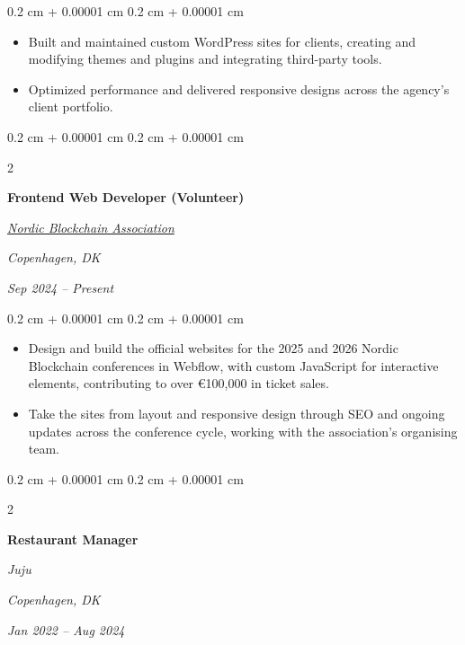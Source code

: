 \documentclass[10pt, letterpaper]{article}
\newenvironment{highlights}{
    \begin{itemize}[
        topsep=0.10 cm,
        parsep=0.10 cm,
        partopsep=0pt,
        itemsep=0pt,
        leftmargin=0.4 cm + 10pt
    ]
}{
    \end{itemize}
} %
\newenvironment{onecolentry}{
    \begin{adjustwidth}{
        0.2 cm + 0.00001 cm
    }{
        0.2 cm + 0.00001 cm
    }
}{
    \end{adjustwidth}
} %
\newenvironment{twocolentry}[2][]{
    \onecolentry
    \def\secondColumn{#2}
    \setcolumnwidth{\fill, 4.5 cm}
    \begin{paracol}{2}
}{
    \switchcolumn \raggedleft \secondColumn
    \end{paracol}
    \endonecolentry
} %
\let\hrefWithoutArrow\href
\renewcommand{\href}[2]{\hrefWithoutArrow{#1}{\ifthenelse{\equal{#2}{}}{ }{#2 }\raisebox{.15ex}{\footnotesize \faExternalLink*}}}
\begin{document}
        \vspace{0.10 cm}

        \begin{onecolentry}
            \begin{highlights}
                \item Built and maintained custom WordPress sites for clients, creating and modifying themes and plugins and integrating third-party tools.
                \item Optimized performance and delivered responsive designs across the agency's client portfolio.
            \end{highlights}
        \end{onecolentry}

        \vspace{0.30 cm}

        \begin{twocolentry}{
            \textit{Copenhagen, DK}

            \textit{Sep 2024 – Present}}
            \textbf{Frontend Web Developer (Volunteer)}

            \hrefWithoutArrow{https://www.nordicblockchain.com/} {\color{black} \hspace*{0.13cm}\textit{Nordic Blockchain Association}}
        \end{twocolentry}

        \vspace{0.10 cm}

        \begin{onecolentry}
            \begin{highlights}
                \item Design and build the official websites for the 2025 and 2026 Nordic Blockchain conferences in Webflow, with custom JavaScript for interactive elements, contributing to over €100,000 in ticket sales.
                \item Take the sites from layout and responsive design through SEO and ongoing updates across the conference cycle, working with the association's organising team.
            \end{highlights}
        \end{onecolentry}

        \newpage

        \begin{twocolentry}{
            \textit{Copenhagen, DK}

            \textit{Jan 2022 – Aug 2024}}
            \textbf{Restaurant Manager}

            \hspace*{0.13cm}\textit{Juju}
        \end{twocolentry}
\end{document}
